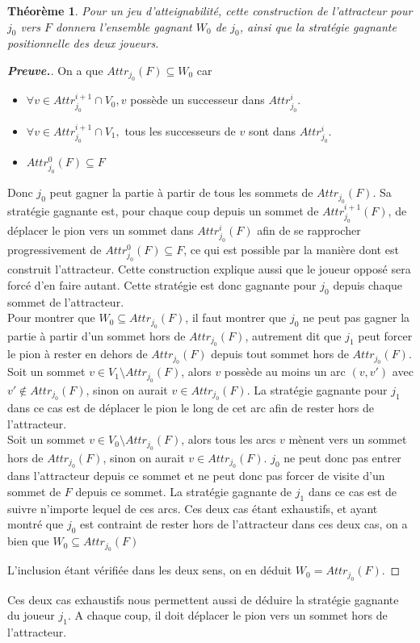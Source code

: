 \documentclass[12pt,a4paper,oneside,titlepage]{report}
\newtheorem{thm}{Th\'eor\`eme}[section]
\newenvironment{demonstration}{\begin{proof}[\textnormal{\textbf{Preuve.}}]}{\end{proof}}
\begin{document}
\begin{thm} 
	Pour un jeu d'atteignabilité, cette construction de l'attracteur pour $j_0$ vers $F$ donnera l'ensemble gagnant $W_0$ de $j_0$, ainsi que la stratégie gagnante positionnelle des deux joueurs.
\end{thm}
\begin{demonstration}{
On a que $Attr_{j_0}(F)\subseteq W_0 $ car
\begin{itemize}
\item $\forall v \in Attr_{j_0}^{i+1}\cap V_0, v$ possède un successeur dans $Attr_{j_0}^i$.
\item $\forall v \in Attr_{j_0}^{i+1}\cap V_1,$ tous les successeurs de $v$ sont dans $Attr_{j_0}^i$.
\item $Attr_{j_0}^0(F) \subseteq F$
\end{itemize}
Donc $j_0$ peut gagner la partie à partir de tous les sommets de $Attr_{j_0}(F)$. Sa stratégie gagnante est, pour chaque coup depuis un sommet de $Attr^{i+1}_{j_0}(F)$, de déplacer le pion vers un sommet dans $Attr^{i}_{j_0}(F)$ afin de se rapprocher progressivement de $Attr_{j_0}^0(F) \subseteq F$, ce qui est possible par la manière dont est construit l'attracteur. Cette construction explique aussi que le joueur opposé sera forcé d'en faire autant. Cette stratégie est donc gagnante pour $j_0$ depuis chaque sommet de l'attracteur.\\

\noindent Pour montrer que $W_0\subseteq Attr_{j_0}(F)$, il faut montrer que $j_0$ ne peut pas gagner la partie à partir d'un sommet hors de $Attr_{j_0}(F)$, autrement dit que $j_1$ peut forcer le pion à rester en dehors de $Attr_{j_0}(F)$ depuis tout sommet hors de $Attr_{j_0}(F)$.\\
Soit un sommet $v\in V_1\setminus Attr_{j_0}(F)$, alors $v$ possède au moins un arc $(v, v')$ avec $v'\notin Attr_{j_0}(F)$, sinon on aurait $v \in Attr_{j_0}(F)$. La stratégie gagnante pour $j_1$ dans ce cas est de déplacer le pion le long de cet arc afin de rester hors de l'attracteur.\\
Soit  un sommet $v\in V_0\setminus Attr_{j_0}(F)$, alors tous les arcs $v$
mènent vers un sommet hors de $Attr_{j_0}(F)$, sinon on aurait $v \in Attr_{j_0}(F)$. $j_0$ ne peut donc pas entrer dans l'attracteur depuis ce sommet et ne peut donc pas forcer de visite d'un sommet de $F$ depuis ce sommet. La stratégie gagnante de $j_1$ dans ce cas est de suivre n'importe lequel de ces arcs.
Ces deux cas étant exhaustifs, et ayant montré que $j_0$ est contraint de rester hors de l'attracteur dans ces deux cas, on a bien que $W_0\subseteq Attr_{j_0}(F)$

\noindent L'inclusion étant vérifiée dans les deux sens, on en déduit $W_0 = Attr_{j_0}(F)$.}
\end{demonstration}
\noindent Ces deux cas exhaustifs nous permettent aussi de déduire la stratégie gagnante du joueur $j_1$. A chaque coup, il doit déplacer le pion vers un sommet hors de l'attracteur.
\end{document}

